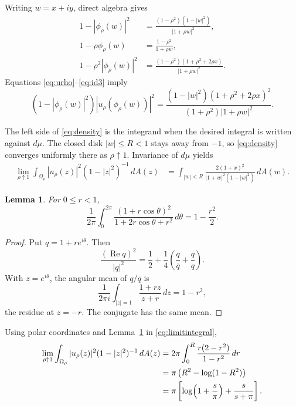 \documentclass[11pt]{article}
\newtheorem{lemma}{Lemma}
\newcommand{\dd}{\,d}
\begin{document}
Writing \(w=x+iy\), direct algebra gives
\begin{align}
 1-|\phi_\rho(w)|^2
 &=\frac{(1-\rho^2)(1-|w|^2)}{|1+\rho w|^2},\label{eq:id1}\\
 1-\rho\phi_\rho(w)
 &=\frac{1-\rho^2}{1+\rho w},\label{eq:id2}\\
 1-\rho^2|\phi_\rho(w)|^2
 &=\frac{(1-\rho^2)(1+\rho^2+2\rho x)}
 {|1+\rho w|^2}.\label{eq:id3}
\end{align}
Equations \eqref{eq:urho}--\eqref{eq:id3} imply
\begin{equation}\label{eq:density}
 (1-|\phi_\rho(w)|^2)|u_\rho(\phi_\rho(w))|^2
 =
 \frac{(1-|w|^2)(1+\rho^2+2\rho x)^2}
 {(1+\rho^2)|1+\rho w|^2}.
\end{equation}

The left side of \eqref{eq:density} is the integrand when the desired
integral is written against \(d\mu\). The closed disk \(|w|\le R<1\) stays
away from \(-1\), so \eqref{eq:density} converges uniformly there as
\(\rho\uparrow1\). Invariance of \(d\mu\) yields
\begin{align}
 \lim_{\rho\uparrow1}
 \int_{\Omega_\rho}|u_\rho(z)|^2(1-|z|^2)^{-1}\dd A(z)
 &=
 \int_{|w|<R}
 \frac{2(1+x)^2}{|1+w|^2(1-|w|^2)}\dd A(w).
 \label{eq:limitintegral}
\end{align}

\begin{lemma}\label{lem:angular}
For \(0\le r<1\),
\[
 \frac1{2\pi}\int_0^{2\pi}
 \frac{(1+r\cos\theta)^2}
 {1+2r\cos\theta+r^2}\dd\theta
 =1-\frac{r^2}{2}.
\]
\end{lemma}

\begin{proof}
Put \(q=1+re^{i\theta}\). Then
\[
 \frac{(\operatorname{Re}q)^2}{|q|^2}
 =\frac12+\frac14
 \left(\frac q{\overline q}+\frac{\overline q}q\right).
\]
With \(z=e^{i\theta}\), the angular mean of \(q/\overline q\) is
\[
 \frac1{2\pi i}\int_{|z|=1}\frac{1+rz}{z+r}\dd z=1-r^2,
\]
the residue at \(z=-r\). The conjugate has the same mean.
\end{proof}

Using polar coordinates and Lemma~\ref{lem:angular} in
\eqref{eq:limitintegral},
\begin{align}
 \lim_{\rho\uparrow1}
 \int_{\Omega_\rho}|u_\rho(z)|^2(1-|z|^2)^{-1}\dd A(z)
 &=2\pi\int_0^R\frac{r(2-r^2)}{1-r^2}\dd r \notag\\
 &=\pi\left(R^2-\log(1-R^2)\right)\notag\\
 &=\pi\left[
 \log\!\left(1+\frac{s}{\pi}\right)+\frac{s}{s+\pi}
 \right].
 \label{eq:exactlimit}
\end{align}
\end{document}
